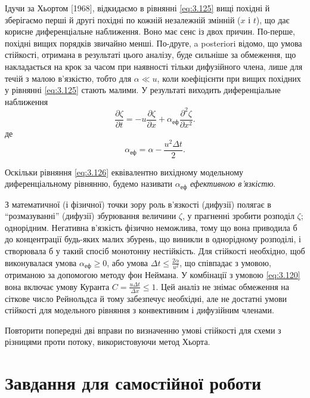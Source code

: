 Ідучи за Хьортом [1968], відкидаємо в рівнянні \eqref{eq:3.125} вищі похідні й зберігаємо перші й другі похідні по кожній незалежній змінній ($x$ і $t$), що дає корисне диференціальне наближення. Воно має сенс із двох причин. По-перше, похідні вищих порядків звичайно менші. По-друге, a posteriori відомо, що умова стійкості, отримана в результаті цього аналізу, буде сильніше за обмеження, що накладається на крок за часом при наявності тільки дифузійного члена, лише для течій з малою в'язкістю, тобто для $\alpha \ll u$, коли коефіцієнти при вищих похідних у рівнянні \eqref{eq:3.125} стають малими. У результаті виходить диференціальне наближення
\begin{equation}
 	\label{eq:3.126}
 	\frac{\partial \zeta}{\partial t} = -u \frac{\partial \zeta}{\partial x} + \alpha_{\text{еф}} \frac{\partial^2 \zeta}{\partial x^2}.
\end{equation}
де
\begin{equation}
 	\label{eq:3.127}
 	\alpha_{\text{еф}} = \alpha - \frac{u^2 \Delta t}{2}.
\end{equation}

\begin{definition}
    Оскільки рівняння \eqref{eq:3.126} еквівалентно вихідному модельному диференціальному рівнянню, будемо називати $\alpha_{\text{еф}}$ \emph{ефективною в'язкістю}.
\end{definition}

З математичної (і фізичної) точки зору роль в'язкості (дифузії) полягає в ``розмазуванні'' (дифузії) збурювання величини $\zeta$, у прагненні зробити розподіл $\zeta$; однорідним. Негативна в'язкість фізично неможлива, тому що вона приводила б до концентрації будь-яких малих збурень, що виникли в однорідному розподілі, і створювала б у такий спосіб монотонну нестійкість. Для стійкості необхідно, щоб виконувалася умова $\alpha_{\text{еф}} \ge 0$, або умова $\Delta t \le \frac{2 \alpha}{u^2}$, що співпадає з умовою, %
отриманою за допомогою методу фон Неймана. У комбінації з умовою \eqref{eq:3.120} вона включає умову Куранта $C = \frac{u \Delta t}{\Delta x} \le 1$. Цей аналіз не знімає обмеження %
на сіткове число Рейнольдса й тому забезпечує необхідні, але не достатні умови стійкості для модельного рівняння з конвективним і дифузійним членами.

\begin{exercise}
    Повторити попередні дві вправи по визначенню умові стійкості для схеми з різницями проти потоку, використовуючи метод Хьорта.
\end{exercise}

\section{Завдання для самостійної роботи}

